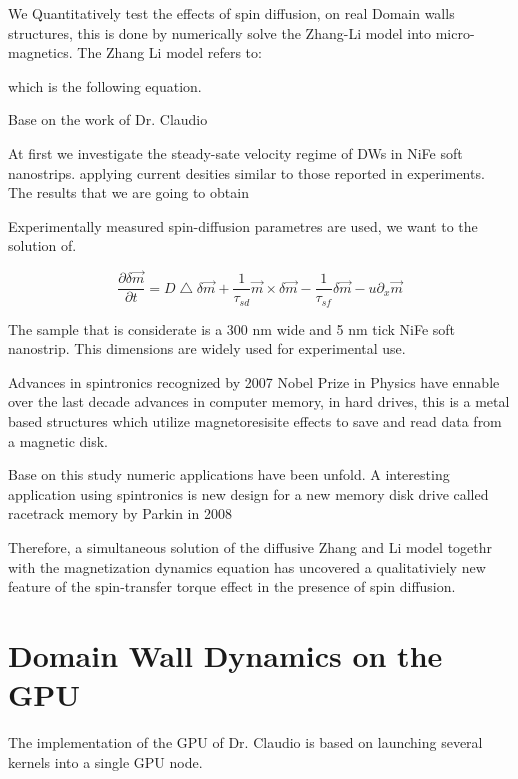 
We Quantitatively test the effects of spin diffusion, on real Domain walls structures, this is done by numerically solve the Zhang-Li model \cite{zhang} into micro-magnetics.
The Zhang Li model refers to:

which is the following equation.

Base on the work of Dr. Claudio \cite{claudio}

At first we investigate the steady-sate velocity regime of DWs in NiFe soft nanostrips. applying current desities similar to those reported in experiments. The results that we are going to obtain 

Experimentally measured spin-diffusion parametres are used, we want to the solution of. 

\begin{equation}
 \frac{\partial \delta \vec{m} }{\partial t} =  D\bigtriangleup \delta \vec{m} + \frac{1}{\tau_{sd}} \vec{m} \times \delta  \vec{m} - \frac{1}{\tau_{sf}}\delta \vec{m} - u \partial_{x}  \vec{m}
\end{equation}


The sample that is considerate is a 300 nm wide and 5 nm tick NiFe soft nanostrip. This dimensions are widely used for experimental use.


Advances in spintronics recognized by 2007 Nobel Prize in Physics have ennable over the last decade advances in computer memory, in hard drives, this is a metal based structures which utilize magnetoresisite effects to save and read data from a magnetic disk. \cite{handbookspin} 


Base on this study numeric applications have been unfold. A interesting application using spintronics is new design for a new memory disk drive called racetrack memory by  Parkin in 2008\cite{racetrack}


Therefore, a simultaneous solution of the diffusive Zhang and Li model togethr with the magnetization dynamics equation has uncovered a qualitativiely new feature of the spin-transfer torque effect in the presence of spin diffusion.


\section{Domain Wall Dynamics on the GPU}


The implementation of the GPU of Dr. Claudio is based on launching several kernels into a single GPU node.


